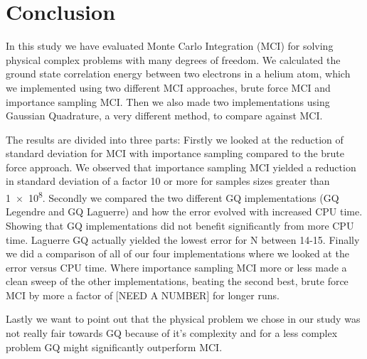 \section{Conclusion}
In this study we have evaluated Monte Carlo Integration (MCI) for solving
physical complex problems with many degrees of freedom. We calculated the ground state correlation energy between two electrons in a helium
atom, which we implemented using two different MCI approaches, brute force MCI
and importance sampling MCI. Then we also made two implementations using
Gaussian Quadrature, a very different method, to compare against MCI. 

The results are divided into three parts: Firstly we looked at the reduction of
standard deviation for MCI with importance sampling compared to the brute force
approach. We observed that importance sampling MCI yielded a reduction in
standard deviation of a factor 10 or 
more for samples sizes greater than \num{1e8}. Secondly we compared the
two different GQ implementations (GQ Legendre and GQ Laguerre) and how the error
evolved with increased CPU time. Showing that GQ implementations did not benefit
significantly from more CPU time. Laguerre GQ actually yielded the lowest error 
for N between 14-15. Finally we did a comparison of all of our four
implementations where we looked at the error versus CPU time. Where
importance sampling MCI more or less made a clean sweep of the other
implementations, beating the second best, brute force MCI by more a factor of
[NEED A NUMBER] for longer runs. 

Lastly we want to point out that the physical problem we chose in our study was
not really fair towards GQ because of it's complexity and for a less
complex problem GQ might significantly outperform MCI.
 
